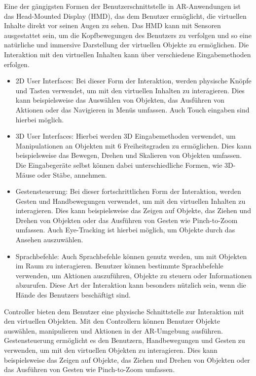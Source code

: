 Eine der gängigsten Formen der Benutzerschnittstelle in AR-Anwendungen ist das
Head-Mounted Display (HMD), das dem Benutzer ermöglicht, die virtuellen Inhalte
direkt vor seinen Augen zu sehen. Das HMD kann mit Sensoren ausgestattet sein,
um die Kopfbewegungen des Benutzers zu verfolgen und so eine natürliche und
immersive Darstellung der virtuellen Objekte zu ermöglichen. Die Interaktion
mit den virtuellen Inhalten kann über verschiedene Eingabemethoden erfolgen.
\begin{itemize}
    \item 2D User Interfaces: Bei dieser Form der Interaktion,
          werden physische Knöpfe und Tasten verwendet, um mit den virtuellen Inhalten zu interagieren.
          Dies kann beispielsweise das Auswählen von Objekten,
          das Ausführen von Aktionen oder das Navigieren in Menüs umfassen.
          Auch Touch eingaben sind hierbei möglich.

    \item 3D User Interfaces: Hierbei werden 3D Eingabemethoden verwendet,
          um Manipulationen an Objekten mit 6 Freiheitsgraden zu ermöglichen.
          Dies kann beispielsweise das Bewegen, Drehen und Skalieren von Objekten umfassen.
          Die Eingabegeräte selbst können dabei unterschiedliche Formen, wie 3D-Mäuse oder Stäbe, annehmen.

    \item Gestensteuerung: Bei dieser fortschrittlichen Form der Interaktion, werden
          Gesten und Handbewegungen verwendet, um mit den virtuellen Inhalten zu
          interagieren. Dies kann beispielsweise das Zeigen auf Objekte, das Ziehen und
          Drehen von Objekten oder das Ausführen von Gesten wie Pinch-to-Zoom umfassen.
          Auch Eye-Tracking ist hierbei möglich, um Objekte durch das Ansehen
          auszuwählen.

    \item Sprachbefehle: Auch Sprachbefehle können genutz werden, um mit Objekten im Raum
          zu interagieren. Benutzer können bestimmte Sprachbefehle verwenden, um Aktionen
          auszuführen, Objekte zu steuern oder Informationen abzurufen. Diese Art der
          Interaktion kann besonders nützlich sein, wenn die Hände des Benutzers
          beschäftigt sind.
\end{itemize}

Controller bieten dem Benutzer eine physische Schnittstelle zur Interaktion mit
den virtuellen Objekten. Mit den Controllern können Benutzer Objekte auswählen,
manipulieren und Aktionen in der AR-Umgebung ausführen. Gestensteuerung
ermöglicht es den Benutzern, Handbewegungen und Gesten zu verwenden, um mit den
virtuellen Objekten zu interagieren. Dies kann beispielsweise das Zeigen auf
Objekte, das Ziehen und Drehen von Objekten oder das Ausführen von Gesten wie
Pinch-to-Zoom umfassen.

